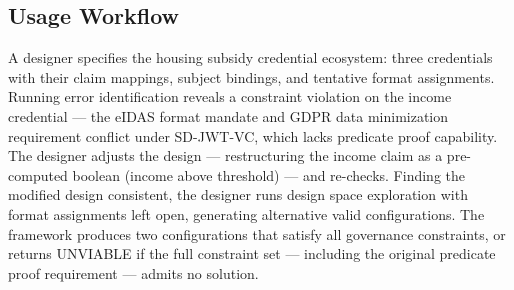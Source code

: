 \subsection{Usage Workflow}\label{usage-workflow}

A designer specifies the housing subsidy credential ecosystem: three credentials with their claim mappings, subject bindings, and tentative format assignments. Running error identification reveals a constraint violation on the income credential --- the eIDAS format mandate and GDPR data minimization requirement conflict under SD-JWT-VC, which lacks predicate proof capability. The designer adjusts the design --- restructuring the income claim as a pre-computed boolean (income above threshold) --- and re-checks. Finding the modified design consistent, the designer runs design space exploration with format assignments left open, generating alternative valid configurations. The framework produces two configurations that satisfy all governance constraints, or returns UNVIABLE if the full constraint set --- including the original predicate proof requirement --- admits no solution.
